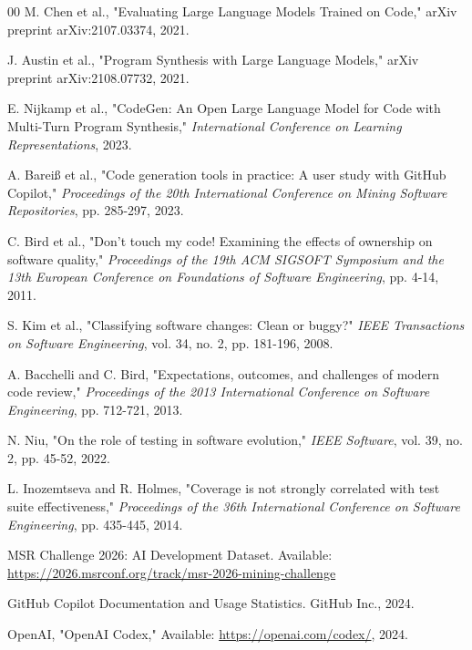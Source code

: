 \documentclass[conference]{IEEEtran}
\begin{document}
\balance
\begin{thebibliography}{00}
 M. Chen et al., "Evaluating Large Language Models Trained on Code," arXiv preprint arXiv:2107.03374, 2021.

 J. Austin et al., "Program Synthesis with Large Language Models," arXiv preprint arXiv:2108.07732, 2021.

 E. Nijkamp et al., "CodeGen: An Open Large Language Model for Code with Multi-Turn Program Synthesis," \textit{International Conference on Learning Representations}, 2023.

 A. Bareiß et al., "Code generation tools in practice: A user study with GitHub Copilot," \textit{Proceedings of the 20th International Conference on Mining Software Repositories}, pp. 285-297, 2023.

 C. Bird et al., "Don't touch my code! Examining the effects of ownership on software quality," \textit{Proceedings of the 19th ACM SIGSOFT Symposium and the 13th European Conference on Foundations of Software Engineering}, pp. 4-14, 2011.

 S. Kim et al., "Classifying software changes: Clean or buggy?" \textit{IEEE Transactions on Software Engineering}, vol. 34, no. 2, pp. 181-196, 2008.

 A. Bacchelli and C. Bird, "Expectations, outcomes, and challenges of modern code review," \textit{Proceedings of the 2013 International Conference on Software Engineering}, pp. 712-721, 2013.

 N. Niu, "On the role of testing in software evolution," \textit{IEEE Software}, vol. 39, no. 2, pp. 45-52, 2022.

 L. Inozemtseva and R. Holmes, "Coverage is not strongly correlated with test suite effectiveness," \textit{Proceedings of the 36th International Conference on Software Engineering}, pp. 435-445, 2014.

 MSR Challenge 2026: AI Development Dataset. Available: \url{https://2026.msrconf.org/track/msr-2026-mining-challenge}

 GitHub Copilot Documentation and Usage Statistics. GitHub Inc., 2024.

 OpenAI, "OpenAI Codex," Available: \url{https://openai.com/codex/}, 2024.

\end{thebibliography}
\end{document}

